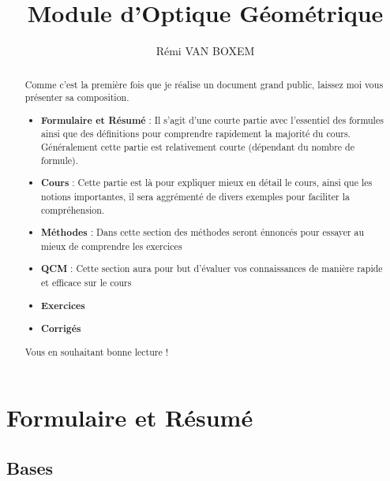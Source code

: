 \documentclass[a4paper,11pt]{article}
\title{Module d'Optique Géométrique}
\author{Rémi VAN BOXEM}
\begin{document}
\maketitle
\tableofcontents

\begin{abstract}
Comme c'est la première fois que je réalise un document grand public, laissez moi vous présenter sa composition.
\begin{itemize}
  \item \textbf{Formulaire et Résumé} : Il s'agit d'une courte partie avec l'essentiel des formules ainsi que des définitions pour comprendre rapidement la majorité du cours. Généralement cette partie est relativement courte (dépendant du nombre de formule).
  \item \textbf{Cours} : Cette partie est là pour expliquer mieux en détail le cours, ainsi que les notions importantes, il sera aggrémenté de divers exemples pour faciliter la compréhension.
  \item \textbf{Méthodes} : Dans cette section des méthodes seront énnoncés pour essayer au mieux de comprendre les exercices
  \item \textbf{QCM} : Cette section aura pour but d'évaluer vos connaissances de manière rapide et efficace sur le cours
  \item \textbf{Exercices}
  \item \textbf{Corrigés}
\end{itemize}
Vous en souhaitant bonne lecture !
\end{abstract}

\section{Formulaire et Résumé}
\subsection{Bases}

\newtheorem{form}{Formule}
\newtheorem{defi}{Définition}
\end{document}
